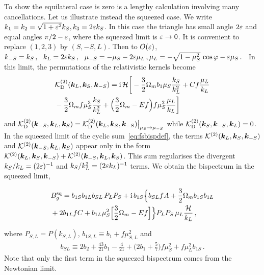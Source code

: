 To show the equilateral case is zero is a lengthy calculation involving many cancellations.  Let us illustrate instead the squeezed case. We write $k_1=k_2=\sqrt{1+\varepsilon^2}k_S, k_3=2\varepsilon k_S$.
In this case the triangle has small angle $2\varepsilon$ and equal angles $\pi/2-\varepsilon$, where the squeezed limit is $\varepsilon\to0$. It is convenient to replace $(1,2,3)$ by $(S,-S,L)$.
Then to $O(\varepsilon)$,
$%
k_{-S}= k_{S}\,,~~k_L=2\ep k_S\,,~~  
\mu_{-S}=-\mu_S-2\ep\mu_L\,,
\mu_L = -\sqrt{1-\mu_S^2}\,\cos\varphi - {\ep\mu_S}\,.
$%
 ~In this limit, the permutations of the relativistic kernels become
\begin{align}
& {\cal K}^{(2)}_{\mathrm{D}}(\bm {k}_L,\bm {k}_S,\bm {k}_{-S}) = \mathrm{i\,} {\mathcal{H}}
{\bigg[- \frac{3}{2}\Omega_m b_1\mu_S \frac{k_S}{k_L^2}+ C f \frac{\mu_L}{k_L} }
\nonumber\\
& - \frac{3}{2} \Omega_m f\mu_S^3 \frac{k_S}{k_L^2} +\Big( \frac{3}{2} \Omega_m- Ef \Big) f\mu_S^2 \frac{\mu_L}{k_L}\bigg] 
\label{k2d1} 
\end{align}
and $ {\cal K}^{(2)}_{\mathrm{D}}(\bm {k}_{-S},\bm {k}_L,\bm {k}_S) =  {\cal K}^{(2)}_{\mathrm{D}}(\bm {k}_L,\bm {k}_S,\bm {k}_{-S})\big|_{\mu_S\to {\mu_{-S}}}$ while ${\cal K}^{(2)}_{\mathrm{D}}(\bm {k}_S,\bm {k}_{-S},\bm {k}_L) =0$. 
In the squeezed limit of the cyclic sum~\eqref{eq:fsbispdef}, the terms $ {\cal K}^{(2)}(\bm {k}_L,\bm {k}_S,\bm {k}_{-S})$ and  ${\cal K}^{(2)}(\bm {k}_{-S},\bm {k}_L,\bm {k}_S)$ appear only in the form ${\cal K}^{(2)}(\bm {k}_L,\bm {k}_S,\bm {k}_{-S})+{\cal K}^{(2)}(\bm {k}_{-S},\bm {k}_L,\bm {k}_S)$. This sum regularises
the divergent $k_S/k_L=(2\varepsilon)^{-1}$ and $k_S/k_L^2=(2\varepsilon k_L)^{-1}$ terms.  We obtain the bispectrum in the squeezed limit,


\begin{align}
&B_{g}^{\mathrm{sq}} = b_{1S}b_{1L}b_{SL}\, P_LP_S+\mathrm{i\,} b_{1S}\Big\{b_{SL}f A + {\frac{3}{2}} \Omega_m b_{1S}b_{1L} 
\nonumber\\
&+2b_{1L}f C+ b_{1L}\mu_S^2\Big[{\frac{3}{2}}\Omega_m- Ef \Big] \Big\}P_LP_S\,\mu_L \frac{\mathcal{H}}{k_L} \,,\label{bgd}
\end{align}


where $P_{S,L}=P(k_{S,L})$, $b_{1S,L}\equiv  b_1+f\mu_{S,L}^2$ and
\begin{align}
b_{SL} \equiv 2b_2+ \frac{43}{21}b_1 - \frac{4}{21}
+\Big(2b_1+ \frac{5}{7}\Big)f\mu_S^2%
+f\mu_L^2 b_{1S}
\,. \nonumber\label{bsl}
\end{align}
Note that only the first term in the squeezed bispectrum comes from the Newtonian limit. 

